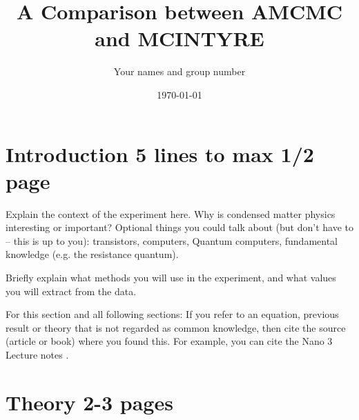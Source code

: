 \documentclass[a4paper]{article}
\title{A Comparison between AMCMC and MCINTYRE}
\author{Your names and group number}
\date{\today}
\begin{document}
\maketitle

\begin{abstract}
\end{abstract}

\section{Introduction 5 lines to max 1/2 page}
\label{sec:introduction}

Explain the context of the experiment here. Why is condensed matter physics interesting or important?
Optional things you could talk about (but don't have to -- this is up to you): transistors, computers, Quantum computers, fundamental knowledge (e.g. the resistance quantum).

Briefly explain what methods you will use in the experiment, and what values you will extract from the data.

For this section and all following sections: If you refer to an equation, previous result or theory that is not regarded as common knowledge, then cite the source (article or book) where you found this. For example, you can cite the Nano 3 Lecture notes \cite{nano3}.

\section{Theory 2-3 pages}
\label{sec:theory}



\end{document}

